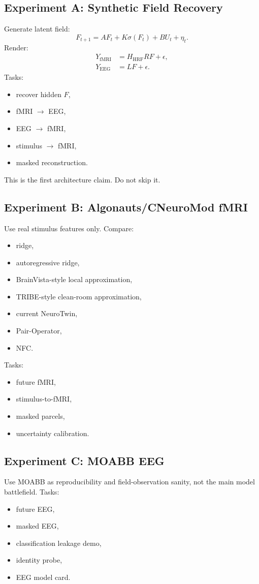 \documentclass[11pt]{article}
\begin{document}
\subsection{Experiment A: Synthetic Field Recovery}
Generate latent field:
\begin{equation}
F_{t+1}=AF_t+K\sigma(F_t)+BU_t+\eta_t.
\end{equation}
Render:
\begin{align}
Y_{\mathrm{fMRI}}&=H_{\mathrm{HRF}}RF+\epsilon,\\
Y_{\mathrm{EEG}}&=LF+\epsilon.
\end{align}
Tasks:
\begin{itemize}
\item recover hidden $F$,
\item fMRI $\rightarrow$ EEG,
\item EEG $\rightarrow$ fMRI,
\item stimulus $\rightarrow$ fMRI,
\item masked reconstruction.
\end{itemize}
This is the first architecture claim. Do not skip it.

\subsection{Experiment B: Algonauts/CNeuroMod fMRI}
Use real stimulus features only. Compare:
\begin{itemize}
\item ridge,
\item autoregressive ridge,
\item BrainVista-style local approximation,
\item TRIBE-style clean-room approximation,
\item current NeuroTwin,
\item Pair-Operator,
\item NFC.
\end{itemize}
Tasks:
\begin{itemize}
\item future fMRI,
\item stimulus-to-fMRI,
\item masked parcels,
\item uncertainty calibration.
\end{itemize}

\subsection{Experiment C: MOABB EEG}
Use MOABB as reproducibility and field-observation sanity, not the main model battlefield. Tasks:
\begin{itemize}
\item future EEG,
\item masked EEG,
\item classification leakage demo,
\item identity probe,
\item EEG model card.
\end{itemize}
\end{document}
